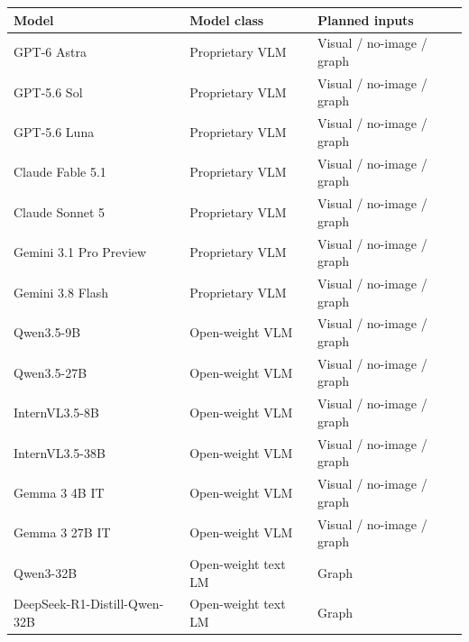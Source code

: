 \begin{tabular}{@{}lll@{}}
\toprule
Model & Model class & Planned inputs\\
\midrule
GPT-6 Astra & Proprietary VLM & Visual / no-image / graph\\
GPT-5.6 Sol & Proprietary VLM & Visual / no-image / graph\\
GPT-5.6 Luna & Proprietary VLM & Visual / no-image / graph\\
Claude Fable 5.1 & Proprietary VLM & Visual / no-image / graph\\
Claude Sonnet 5 & Proprietary VLM & Visual / no-image / graph\\
Gemini 3.1 Pro Preview & Proprietary VLM & Visual / no-image / graph\\
Gemini 3.8 Flash & Proprietary VLM & Visual / no-image / graph\\
Qwen3.5-9B & Open-weight VLM & Visual / no-image / graph\\
Qwen3.5-27B & Open-weight VLM & Visual / no-image / graph\\
InternVL3.5-8B & Open-weight VLM & Visual / no-image / graph\\
InternVL3.5-38B & Open-weight VLM & Visual / no-image / graph\\
Gemma 3 4B IT & Open-weight VLM & Visual / no-image / graph\\
Gemma 3 27B IT & Open-weight VLM & Visual / no-image / graph\\
Qwen3-32B & Open-weight text LM & Graph\\
DeepSeek-R1-Distill-Qwen-32B & Open-weight text LM & Graph\\
\bottomrule
\end{tabular}
